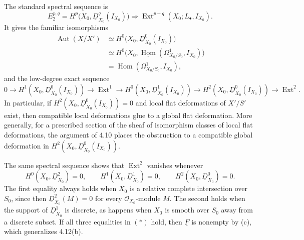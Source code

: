 The standard spectral sequence is
\[
E_2^{p,q}
=H^p\bigl(X_0,\underline D^q_{X_0}(I_{X_0})\bigr)
\Longrightarrow
\operatorname{Ext}^{p+q}(X_0;L_\bullet,I_{X_0}).
\]
It gives the familiar isomorphisms
\begin{align*}
\operatorname{Aut}(X/X')
&\simeq H^0\bigl(X_0,\underline D^0_{X_0}(I_{X_0})\bigr)\\
&\simeq H^0\bigl(X_0,
  \underline{\operatorname{Hom}}
  (\Omega^1_{X_0/S_0},I_{X_0})\bigr)\\
&=\operatorname{Hom}(\Omega^1_{X_0/S_0},I_{X_0}),
\end{align*}
and the low-degree exact sequence
\[
0\longrightarrow H^1(X_0,\underline D^0_{X_0}(I_{X_0}))
\longrightarrow\operatorname{Ext}^1
\longrightarrow H^0(X_0,\underline D^1_{X_0}(I_{X_0}))
\longrightarrow H^2(X_0,\underline D^0_{X_0}(I_{X_0}))
\longrightarrow\operatorname{Ext}^2.
\]
In particular, if
$H^2(X_0,\underline D^0_{X_0}(I_{X_0}))=0$ and local flat
deformations of $X'/S'$ exist, then compatible local deformations
glue to a global flat deformation. More generally, for a prescribed
section of the sheaf of isomorphism classes of local flat
deformations, the argument of 4.10 places the obstruction to a
compatible global deformation in
$H^2(X_0,\underline D^0_{X_0}(I_{X_0}))$.


The same spectral sequence shows that $\operatorname{Ext}^2$ vanishes
whenever
\begin{equation}\tag{*}
H^0(X_0,\underline D^2_{X_0})=0,
\qquad
H^1(X_0,\underline D^1_{X_0})=0,
\qquad
H^2(X_0,\underline D^0_{X_0})=0.
\end{equation}
The first equality always holds when $X_0$ is a relative complete
intersection over $S_0$, since then
$\underline D^2_{X_0}(M)=0$ for every $\mathcal O_{X_0}$-module $M$.
The second holds when the support of $\underline D^1_{X_0}$ is
discrete, as happens when $X_0$ is smooth over $S_0$ away from a
discrete subset. If all three equalities in $(*)$ hold, then
$\underline F$ is nonempty by (c), which generalizes 4.12(b).

